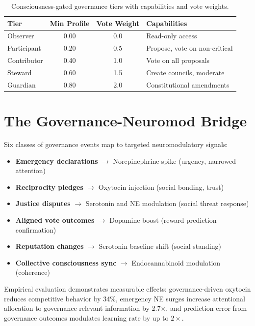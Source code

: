\documentclass[12pt]{book}
\begin{document}
\begin{table}[H]
\centering
\caption{Consciousness-gated governance tiers with capabilities and vote weights.}
\label{tab:governance-tiers}
\begin{tabular}{lccl}
\toprule
\textbf{Tier} & \textbf{Min Profile} & \textbf{Vote Weight} & \textbf{Capabilities} \\
\midrule
Observer & 0.00 & 0.0 & Read-only access \\
Participant & 0.20 & 0.5 & Propose, vote on non-critical \\
Contributor & 0.40 & 1.0 & Vote on all proposals \\
Steward & 0.60 & 1.5 & Create councils, moderate \\
Guardian & 0.80 & 2.0 & Constitutional amendments \\
\bottomrule
\end{tabular}
\end{table}

\section{The Governance-Neuromod Bridge}

Six classes of governance events map to targeted neuromodulatory signals:

\begin{itemize}
  \item \textbf{Emergency declarations} $\to$ Norepinephrine spike (urgency, narrowed attention)
  \item \textbf{Reciprocity pledges} $\to$ Oxytocin injection (social bonding, trust)
  \item \textbf{Justice disputes} $\to$ Serotonin and NE modulation (social threat response)
  \item \textbf{Aligned vote outcomes} $\to$ Dopamine boost (reward prediction confirmation)
  \item \textbf{Reputation changes} $\to$ Serotonin baseline shift (social standing)
  \item \textbf{Collective consciousness sync} $\to$ Endocannabinoid modulation (coherence)
\end{itemize}

Empirical evaluation demonstrates measurable effects: governance-driven oxytocin reduces competitive behavior by 34\%, emergency NE surges increase attentional allocation to governance-relevant information by 2.7$\times$, and prediction error from governance outcomes modulates learning rate by up to $2\times$.
\end{document}
